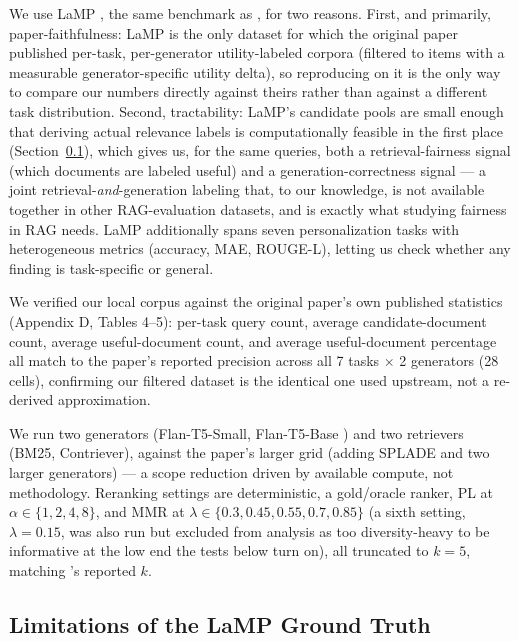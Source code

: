 \documentclass[10pt,twocolumn]{article}
\begin{document}
We use LaMP \cite{salemi2023lamp}, the same benchmark as \cite{eunkim2025fairrag},
for two reasons. First, and primarily, paper-faithfulness: LaMP is the only dataset
for which the original paper published per-task, per-generator utility-labeled
corpora (filtered to items with a measurable generator-specific utility delta), so
reproducing on it is the only way to compare our numbers directly against theirs
rather than against a different task distribution. Second, tractability: LaMP's
candidate pools are small enough that deriving actual relevance labels is
computationally feasible in the first place (Section~\ref{sec:threats}), which gives
us, for the same queries, both a retrieval-fairness signal (which documents are
labeled useful) and a generation-correctness signal --- a joint
retrieval-\emph{and}-generation labeling that,
to our knowledge, is not available together in other RAG-evaluation datasets, and is
exactly what studying fairness in RAG needs. LaMP additionally spans seven
personalization tasks with heterogeneous metrics (accuracy, MAE, ROUGE-L), letting us
check whether any finding is task-specific or general.

We verified our local corpus against the original paper's own published statistics
(Appendix D, Tables 4--5): per-task query count, average candidate-document count,
average useful-document count, and average useful-document percentage all match
to the paper's reported precision across all 7 tasks $\times$ 2 generators (28
cells), confirming our filtered dataset is the identical one used upstream, not a
re-derived approximation.

We run two generators (Flan-T5-Small, Flan-T5-Base \cite{chung2024scaling}) and two
retrievers (BM25, Contriever), against the paper's larger grid (adding SPLADE and
two larger generators) --- a scope reduction driven by available compute, not
methodology. Reranking settings are deterministic, a gold/oracle ranker, PL at
$\alpha \in \{1,2,4,8\}$, and MMR at $\lambda \in \{0.3,0.45,0.55,0.7,0.85\}$ (a sixth
setting, $\lambda{=}0.15$, was also run but excluded from analysis as too
diversity-heavy to be informative at the low end the tests below turn on), all
truncated to $k=5$, matching \cite{eunkim2025fairrag}'s reported $k$.

\subsection{Limitations of the LaMP Ground Truth}
\label{sec:threats}
\end{document}
